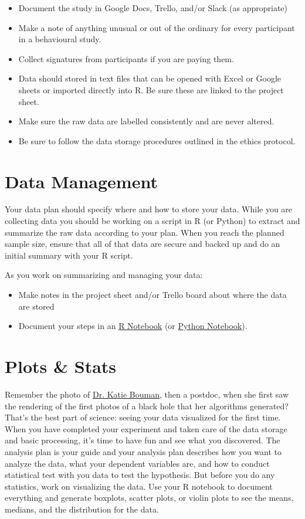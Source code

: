 \documentclass{article}
\begin{document}
\begin{itemize}
\item Document the study in Google Docs, Trello, and/or Slack (as appropriate)
\item Make a note of anything unusual or out of the ordinary for every participant in a behavioural study.
\item Collect signatures from participants if you are paying them. 
\item Data should stored in text files that can be opened with Excel or Google sheets or imported directly into R. Be sure these are linked to the project sheet. 
\item Make sure the raw data are labelled consistently and are never altered.
\item Be sure to follow the data storage procedures outlined in the ethics protocol.
\end{itemize}

\section{Data Management}
Your data plan should specify where and how to store your data. While you are collecting data you should be working on a script in R (or Python) to extract and summarize the raw data according to your plan. When you reach the planned sample size, ensure that all of that data are secure and backed up and do an initial summary with your R script. 

As you work on summarizing and managing your data:

\begin{itemize}
\item Make notes in the project sheet and/or Trello board about where the data are stored
\item Document your steps in an \href{https://www.rstudio.com/}{R Notebook} (or \href{https://jupyter.org/}{Python Notebook}). 
\end{itemize}

\section{Plots \& Stats}
Remember the photo of \href{https://www.cnn.com/2019/04/10/us/katie-bouman-mit-black-hole-algorithm-sci-trnd/index.html}{Dr. Katie Bouman}, then a postdoc, when she first saw the rendering of the first photos of a black hole that her algorithms generated? That's the best part of science: seeing your data visualized for the first time. When you have completed your experiment and taken care of the data storage and basic processing, it's time to have fun and see what you discovered. The analysis plan is your guide and your analysis plan describes how you want to analyze the data, what your dependent variables are, and how to conduct statistical test with you data to test the hypothesis. But before you do any statistics, work on visualizing the data. Use your R notebook to document everything and generate boxplots, scatter plots, or violin plots to see the means, medians, and the distribution for the data. 
\end{document}
